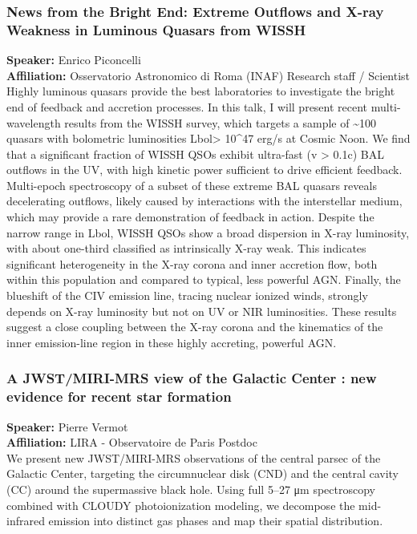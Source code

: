 \subsubsection*{News from the Bright End: Extreme Outflows and X-ray Weakness in Luminous Quasars from WISSH}
\textbf{Speaker:} Enrico Piconcelli \\
\textbf{Affiliation:} Osservatorio Astronomico di Roma (INAF) \textperiodcentered{} Research staff / Scientist\\
Highly luminous quasars provide the best laboratories to investigate the bright end of feedback and accretion processes. In this talk, I will present recent multi-wavelength results from the WISSH survey, which targets a sample of \textasciitilde{}100 quasars with bolometric luminosities Lbol> 10\textasciicircum{}47 erg/s at Cosmic Noon.
We find that a significant fraction of WISSH QSOs exhibit ultra-fast (v > 0.1c) BAL outflows in the UV, with high kinetic power sufficient to drive efficient feedback. Multi-epoch spectroscopy of a subset of these extreme BAL quasars reveals decelerating outflows, likely caused by interactions with the interstellar medium, which may provide a rare demonstration of feedback in action.
Despite the narrow range in Lbol, WISSH QSOs show a broad dispersion in X-ray luminosity, with about one-third classified as intrinsically X-ray weak. This indicates significant heterogeneity in the X-ray corona and inner accretion flow, both within this population and compared to typical, less powerful AGN. Finally, the blueshift of the CIV emission line, tracing nuclear ionized winds, strongly depends on X-ray luminosity but not on UV or NIR luminosities. These results suggest a close coupling between the X-ray corona and the kinematics of the inner emission-line region in these highly accreting, powerful AGN.

\hypertarget{abs-49}{}
\subsubsection*{A JWST/MIRI-MRS view of the Galactic Center : new evidence for recent star formation}
\textbf{Speaker:} Pierre Vermot \\
\textbf{Affiliation:} LIRA - Observatoire de Paris \textperiodcentered{} Postdoc\\
We present new JWST/MIRI-MRS observations of the central parsec of the Galactic Center, targeting the circumnuclear disk (CND) and the central cavity (CC) around the supermassive black hole. Using full 5–27 μm spectroscopy combined with CLOUDY photoionization modeling, we decompose the mid-infrared emission into distinct gas phases and map their spatial distribution.

